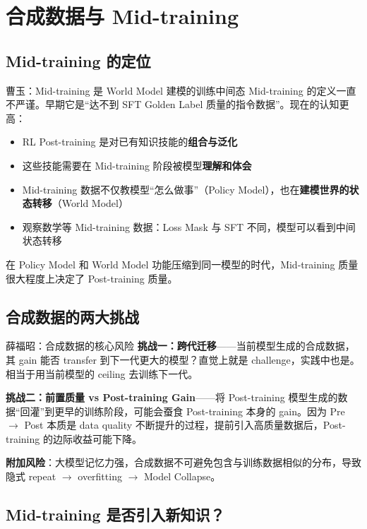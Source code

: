 \section{合成数据与 Mid-training}

\subsection{Mid-training 的定位}

\begin{importantbox}{曹玉：Mid-training 是 World Model 建模的训练中间态}
Mid-training 的定义一直不严谨。早期它是``达不到 SFT Golden Label 质量的指令数据''。现在的认知更高：
\begin{itemize}
  \item RL Post-training 是对已有知识技能的\textbf{组合与泛化}
  \item 这些技能需要在 Mid-training 阶段被模型\textbf{理解和体会}
  \item Mid-training 数据不仅教模型``怎么做事''（Policy Model），也在\textbf{建模世界的状态转移}（World Model）
  \item 观察数学等 Mid-training 数据：Loss Mask 与 SFT 不同，模型可以看到中间状态转移
\end{itemize}
在 Policy Model 和 World Model 功能压缩到同一模型的时代，Mid-training 质量很大程度上决定了 Post-training 质量。
\end{importantbox}

\subsection{合成数据的两大挑战}

\begin{warningbox}{薛福昭：合成数据的核心风险}
\textbf{挑战一：跨代迁移}——当前模型生成的合成数据，其 gain 能否 transfer 到下一代更大的模型？直觉上就是 challenge，实践中也是。相当于用当前模型的 ceiling 去训练下一代。

\textbf{挑战二：前置质量 vs Post-training Gain}——将 Post-training 模型生成的数据``回灌''到更早的训练阶段，可能会蚕食 Post-training 本身的 gain。因为 Pre $\to$ Post 本质是 data quality 不断提升的过程，提前引入高质量数据后，Post-training 的边际收益可能下降。

\textbf{附加风险}：大模型记忆力强，合成数据不可避免包含与训练数据相似的分布，导致隐式 repeat $\to$ overfitting $\to$ Model Collapse。
\end{warningbox}

\subsection{Mid-training 是否引入新知识？}

